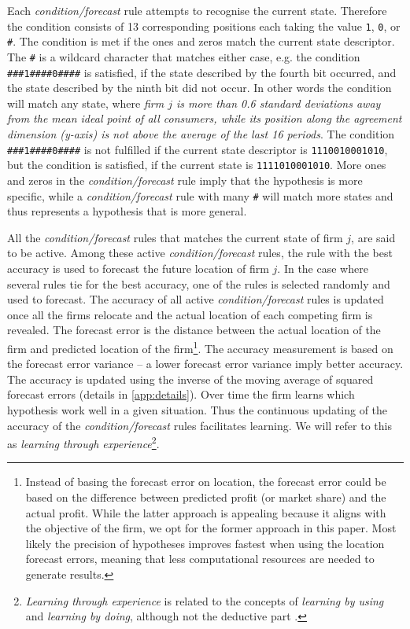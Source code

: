 \documentclass[preprint, 12pt]{elsarticle}
\begin{document}
Each \emph{condition/forecast} rule attempts to recognise the current state. Therefore the condition consists of 13 corresponding positions each taking the value \texttt{1}, \texttt{0}, or \texttt{\#}. The condition is met if the ones and zeros match the current state descriptor. The \texttt{\#} is a wildcard character that matches either case, e.g. the condition \texttt{\#\#\#1\#\#\#\#0\#\#\#\#} is satisfied, if the state described by the fourth bit occurred, and the state described by the ninth bit did not occur. In other words the condition will match any state, where \emph{firm $j$ is more than 0.6 standard deviations away from the mean ideal point of all consumers, while its position along the agreement dimension (y-axis) is not above the average of the last 16 periods}. The condition \texttt{\#\#\#1\#\#\#\#0\#\#\#\#} is not fulfilled if the current state descriptor is \texttt{1110010001010}, but the condition is satisfied, if the current state is \texttt{1111010001010}. More ones and zeros in the \emph{condition/forecast} rule imply that the hypothesis is more specific, while a \emph{condition/forecast} rule with many \texttt{\#} will match more states and thus represents a hypothesis that is more general.

All the \emph{condition/forecast} rules that matches the current state of firm $j$, are said to be active. Among these active \emph{condition/forecast} rules, the rule with the best accuracy is used to forecast the future location of firm $j$. In the case where several rules tie for the best accuracy, one of the rules is selected randomly and used to forecast. The accuracy of all active \emph{condition/forecast} rules is updated once all the firms relocate and the actual location of each competing firm is revealed. The forecast error is the distance between the actual location of the firm and predicted location of the firm\footnote{Instead of basing the forecast error on location, the forecast error could be based on the difference between predicted profit (or market share) and the actual profit. While the latter approach is appealing because it aligns with the objective of the firm, we opt for the former approach in this paper. Most likely the precision of hypotheses improves fastest when using the location forecast errors, meaning that less computational resources are needed to generate results.}. The accuracy measurement is based on the forecast error variance -- a lower forecast error variance imply better accuracy. The accuracy is updated using the inverse of the moving average of squared forecast errors (details in \ref{app:details}). Over time the firm learns which hypothesis work well in a given situation. Thus the continuous updating of the accuracy of the \emph{condition/forecast} rules facilitates learning. We will refer to this as \emph{learning through experience}\footnote{\emph{Learning through experience} is related to the concepts of \emph{learning by using} \citep{Rosenberg_1982} and \emph{learning by doing}, although not the deductive part \citep{Arrow_1971}.}.
\end{document}
